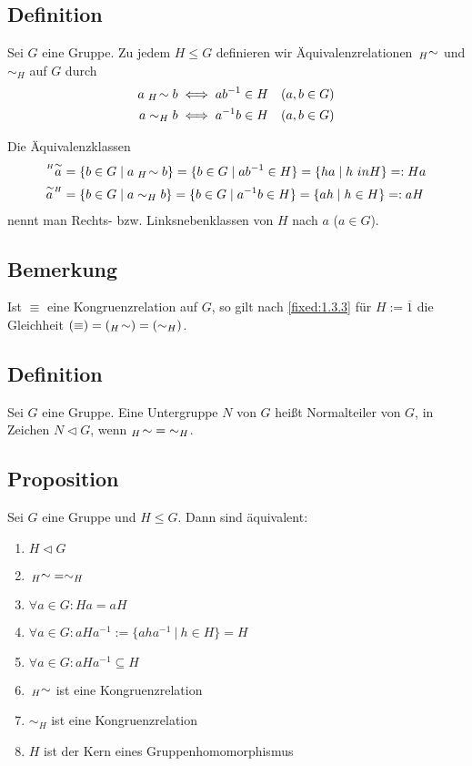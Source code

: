 \subsection{Definition} Sei $G$ eine Gruppe. Zu jedem $H \leq G$ definieren wir Äquivalenzrelationen $\sideset{_H}{}{\mathop\sim}$ und $\sim_H$ auf $G$ durch
\begin{align*}
	a \mathrel{{}_H\!\sim} b & \iff ab^{-1} \in H & (a,b \in G) \\
	a \mathrel{\sim_H} b & \iff a^{-1}b \in H & (a,b \in G)
\end{align*}

Die Äquivalenzklassen
\begin{align*}
	\eqaccentleft Ha &=\{b \in G \mid a \eqsimleft H b \} = \{b\in G \mid ab^{-1} \in H\} = \{ha \mid h\ in H\} =: Ha \\
	\eqaccentright aH &= \{b \in G \mid a \eqsimright H b \} = \{b \in G \mid a^{-1}b \in H \} = \{ah \mid h \in H\} =: aH
\end{align*}
nennt man Rechts- bzw. Linksnebenklassen von $H$ nach $a$ ($a \in G$).

\subsection{Bemerkung}
	Ist $\equiv$ eine Kongruenzrelation auf $G$, so gilt nach \ref{fixed:1.3.3} für $H:=\overline{1}$ die Gleichheit $(\equiv) = (\mathrel{{}_H\!\sim}) = (\mathrel{\sim_H})$.
	
\subsection{Definition} Sei $G$ eine Gruppe. Eine Untergruppe $N$ von $G$ heißt Normalteiler von $G$, in Zeichen $N \triangleleft G$, wenn $\mathrel{{}_H\!\sim} {=} \mathrel{\sim_H}$.

\subsection{Proposition} \label{fixed:1.3.7}
Sei $G$ eine Gruppe und $H\leq G$. Dann sind äquivalent:
\begin{enumerate}[label={\alph*)}]
	\item $H\triangleleft G$
	\item $\sideset{_H}{}{\mathop\sim}=\sim_H$
	\item $\forall a \in G:Ha=aH$
	\item $\forall a\in G: aHa^{-1} :=\{aha^{-1}\:| \: h \in H\}=H$
	\item $\forall a\in G: aHa^{-1} \subseteq H$
	\item $\sideset{_H}{}{\mathop\sim}$ ist eine Kongruenzrelation
	\item  $\sim_H$ ist eine Kongruenzrelation
	\item $H$ ist der Kern eines Gruppenhomomorphismus	
\end{enumerate}		

